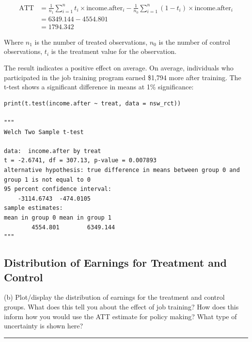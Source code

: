 \documentclass{article}
\newenvironment{colorparagraph}[1]{\par\color{#1}}{\par}
\begin{document}
\begin{align*}
    \text{ATT}
    &= \frac{1}{n_1} \sum_{i = 1}^n t_i \times \text{income.after}_i - \frac{1}{n_0} \sum_{i = 1}^n (1 - t_i) \times \text{income.after}_i \\
    &= 6349.144 - 4554.801 \\ &= 1794.342
\end{align*}

Where $n_1$ is the number of treated observations, $n_0$ is the number of control observations, $t_i$ is the treatment value for the observation. 

The result indicates a positive effect on average. On average, individuals who participated in the job training program earned \$1,794 more after training. The t-test shows a significant difference in means at 1\% significance:

\begin{lstlisting}[style=Rstyle, caption=ATT Significance]
print(t.test(income.after ~ treat, data = nsw_rct))

"""
Welch Two Sample t-test

data:  income.after by treat
t = -2.6741, df = 307.13, p-value = 0.007893
alternative hypothesis: true difference in means between group 0 and group 1 is not equal to 0
95 percent confidence interval:
    -3114.6743  -474.0105
sample estimates:
mean in group 0 mean in group 1 
        4554.801        6349.144
"""
\end{lstlisting}

\begin{colorparagraph}{questioncolor}
\label{q4b}\subsection{Distribution of Earnings for Treatment and Control}
(b) Plot/display the distribution of earnings for the treatment and control groups. What does this tell you about the effect of job training? How does this inform how you would use the ATT estimate for policy making? What type of uncertainty is shown here?

\rule{\textwidth}{0.5pt}
\end{colorparagraph}
\end{document}
